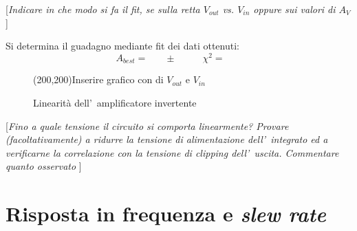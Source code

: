 \documentclass[10pt,a4paper]{article}
\newcommand{\rem}[1]{[\emph{#1}]}
\newcommand{\exn}{\phantom{xxx}}
\begin{document}
	\rem{Indicare in che modo si fa il fit, se sulla retta $V_{out}$ vs. $V_{in}$ oppure sui valori di $A_V$   }
	
	Si determina il guadagno mediante fit dei dati ottenuti:
	\[
	A_{best} = \exn \pm \exn \quad  \chi^2 = \exn
	\]
	\begin{figure}[t]
		\begin{center}
			\framebox(200,200){Inserire grafico con di $V_{out}$ e $V_{in}$}
		\end{center}
		\caption{\small Linearit\`a dell'~amplificatore invertente}
		\label{fig:lin}
	\end{figure}
	
	\rem{Fino a quale tensione il circuito si comporta linearmente? Provare (facoltativamente) a ridurre la 
		tensione di alimentazione dell'~integrato ed a verificarne la correlazione con la tensione di 
		\emph{clipping} dell'~uscita. Commentare quanto osservato }
	
	\section{Risposta in frequenza e \emph{slew rate}}
\end{document}
